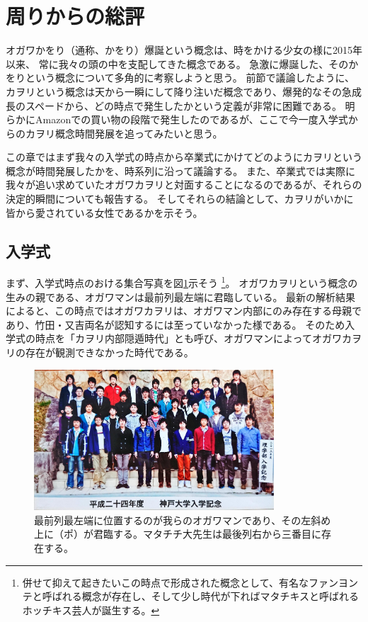 
\section{周りからの総評}
オガワかをり（通称、かをり）爆誕という概念は、時をかける少女の様に2015年以来、
常に我々の頭の中を支配してきた概念である。
急激に爆誕した、そのかをりという概念について多角的に考察しようと思う。
前節で議論したように、カヲリという概念は天から一瞬にして降り注いだ概念であり、爆発的なその急成長のスペードから、どの時点で発生したかという定義が非常に困難である。
明らかにAmazonでの買い物の段階で発生したのであるが、ここで今一度入学式からのカヲリ概念時間発展を追ってみたいと思う。
\par
この章ではまず我々の入学式の時点から卒業式にかけてどのようにカヲリという概念が時間発展したかを、時系列に沿って議論する。
また、卒業式では実際に我々が追い求めていたオガワカヲリと対面することになるのであるが、それらの決定的瞬間についても報告する。
そしてそれらの結論として、カヲリがいかに皆から愛されている女性であるかを示そう。

\subsection{入学式}

まず、入学式時点のおける集合写真を図\ref{fig:H24Nyugakushiki}示そう
\footnote{併せて抑えて起きたいこの時点で形成された概念として、有名なファンヨンテと呼ばれる概念が存在し、そして少し時代が下ればマタチキスと呼ばれるホッチキス芸人が誕生する。}。
オガワカヲリという概念の生みの親である、オガワマンは最前列最左端に君臨している。
最新の解析結果によると、この時点ではオガワカヲリは、オガワマン内部にのみ存在する母親であり、竹田・又吉両名が認知するには至っていなかった様である。
そのため入学式の時点を「カヲリ内部隠遁時代」とも呼び、オガワマンによってオガワカヲリの存在が観測できなかった時代である。

\begin{figure}[H]
  \centering
  \includegraphics[width=0.8\textwidth]{./section/Kawori/figures/H24Nyugakushiki.jpg}
  \caption{最前列最左端に位置するのが我らのオガワマンであり、その左斜め上に（ポ）が君臨する。マタチチ大先生は最後列右から三番目に存在する。}
\label{fig:H24Nyugakushiki}
\end{figure}

